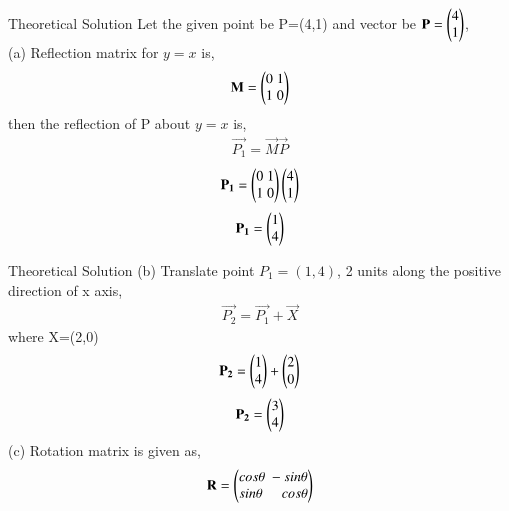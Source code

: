 \documentclass{beamer}
\begin{document}
	
\begin{frame}{Theoretical Solution}
	Let the given point be P=(4,1) and vector be $\mathbf{P}=\begin{pmatrix}4\\1\end{pmatrix}$,\\
             (a) Reflection matrix for $y=x$ is,
             \begin{align}
                 \mathbf{M}=\begin{pmatrix}0\;1\\1\;0\end{pmatrix}
             \end{align}
             then the reflection of P about $y=x$ is,
             \begin{align}
                 \vec{P_1}=\vec{M}\vec{P}
             \end{align}
             \begin{align}
                 \mathbf{P_1}=\begin{pmatrix}0\;1\\1\;0\end{pmatrix}\begin{pmatrix}4\\1\end{pmatrix}
             \end{align}
             \begin{align}
                 \mathbf{P_1}=\begin{pmatrix}1\\4\end{pmatrix}
             \end{align}
             
\end{frame}
\begin{frame}{Theoretical Solution}
(b) Translate point $P_1=(1,4)$, 2 units along the positive direction of x axis,
             \begin{align}
                 \vec{P_2} = \vec{P_1} + \vec{X}
             \end{align}
             where X=(2,0)
             \begin{align}
                 \mathbf{P_2} = \begin{pmatrix}1\\4\end{pmatrix}+\begin{pmatrix}2\\0\end{pmatrix}
             \end{align}
             \begin{align}
                 \mathbf{P_2} = \begin{pmatrix}3\\4\end{pmatrix}
             \end{align}
             (c) Rotation matrix is given as,
             \begin{align}
                 \mathbf{R}=\begin{pmatrix}cos\theta\;-sin\theta\\sin\theta\;\;\;\;\;cos\theta\end{pmatrix}
             \end{align}
             
	\end{frame}
\end{document}
